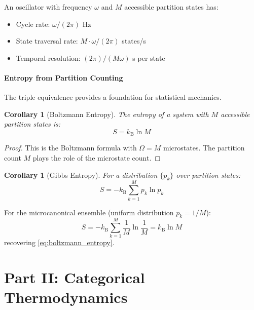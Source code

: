 \documentclass[twocolumn,10pt,twoside]{article}
\newtheorem{corollary}[theorem]{Corollary}
\newcommand{\kb}{k_{\mathrm{B}}}
\begin{document}
An oscillator with frequency $\omega$ and $M$ accessible partition states has:
\begin{itemize}
    \item Cycle rate: $\omega/(2\pi)$ Hz
    \item State traversal rate: $M \cdot \omega/(2\pi)$ states/s
    \item Temporal resolution: $(2\pi)/(M\omega)$ s per state
\end{itemize}

\subsection{Entropy from Partition Counting}

The triple equivalence provides a foundation for statistical mechanics.

\begin{corollary}[Boltzmann Entropy]
The entropy of a system with $M$ accessible partition states is:
\begin{equation}
S = \kb \ln M
\label{eq:boltzmann_entropy}
\end{equation}
\end{corollary}

\begin{proof}
This is the Boltzmann formula with $\Omega = M$ microstates. The partition count $M$ plays the role of the microstate count.
\end{proof}

\begin{corollary}[Gibbs Entropy]
For a distribution $\{p_k\}$ over partition states:
\begin{equation}
S = -\kb \sum_{k=1}^{M} p_k \ln p_k
\label{eq:gibbs_entropy}
\end{equation}
\end{corollary}

For the microcanonical ensemble (uniform distribution $p_k = 1/M$):
\begin{equation}
S = -\kb \sum_{k=1}^{M} \frac{1}{M} \ln \frac{1}{M} = \kb \ln M
\end{equation}
recovering \eqref{eq:boltzmann_entropy}.


\part*{Part II: Categorical Thermodynamics}
\end{document}
